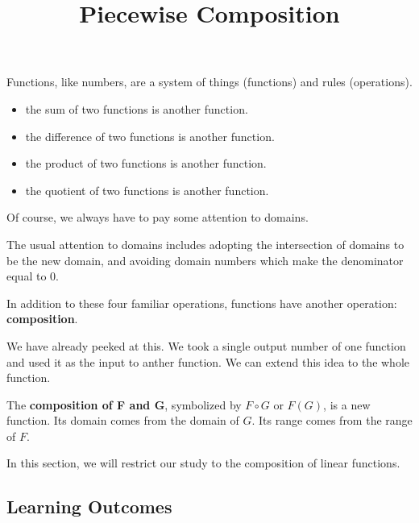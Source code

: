 \documentclass{ximera}
\title{Piecewise Composition}
\begin{document}
\begin{abstract}
\end{abstract}
\maketitle




Functions, like numbers, are a system of things (functions) and rules (operations).  

\begin{itemize}
\item the sum of two functions is another function.
\item the difference of two functions is another function.
\item the product of two functions is another function.
\item the quotient of two functions is another function.
\end{itemize}

Of course, we always have to pay some attention to domains.



The usual attention to domains includes adopting the intersection of domains to be the new domain, and avoiding domain numbers which make the denominator equal to $0$.



In addition to these four familiar operations, functions have another operation: \textbf{\textcolor{purple!85!blue}{composition}}.

We have already peeked at this. We took a single output number of one function and used it as the input to anther function.  We can extend this idea to the whole function.


The \textbf{\textcolor{purple!85!blue}{composition of F and G}}, symbolized by $F \circ G$ or $F(G)$, is a new function.  Its domain comes from the domain of $G$. Its range comes from the range of $F$.



In this section, we will restrict our study to the composition of linear functions.














\subsection{Learning Outcomes}
\end{document}
